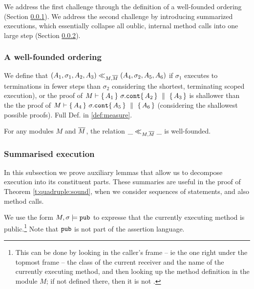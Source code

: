 We address the first challenge  through the definition of a well-founded ordering (\cf Section \ref{sect:prove:wellfounded}). 
We address the second challenge by introducing summarized executions, which essentially collapse all oublic, internal method calls into one large step (\cf Section \ref{sect:termExecs}).

\subsubsection{A well-founded ordering}
\label{sect:prove:wellfounded}

We define that $(A_1,\sigma_1,A_2, A_3) \ll_{M,\overline{M}}  (A_4,\sigma_2,A_5, A_6)$ if $\sigma_1$ executes to terminations in fewer steps than $\sigma_2$ considering the shortest, terminating scoped execution), or  the proof of $M \vdash  \{\, A_1 \, \}\ \sigma.\mbox{\normalfont{\texttt{cont}}} \{\, A_2 \, \} \, \,\parallel\,\, \{\, A_3 \, \}  $
is shallower than the the proof of  $M \vdash  \{\, A_4 \, \}\ \sigma.\mbox{\normalfont{\texttt{cont}}} \{\, A_5 \, \} \, \,\parallel\,\, \{\, A_6 \, \}  $ (considering the shallowest possible proofs). Full Def. in \ref{def:measure}.

 

 


\begin{auxLemma}
\label{lemma:normal:two}
For any modules $M$ and $\overline{M}$,  the relation $\_ \ll_{M,\overline{M}}  \_$ is well-founded.
\end{auxLemma}

\subsubsection{Summarised  execution} 
\label{sect:termExecs}

In this subsection we prove auxiliary lemmas that allow us to decompose execution into its constituent parts. 
These summaries are useful in the proof of Theorem \ref{t:quadruple:sound}, when we consider sequences of statements, and also method calls.


 
\begin{definition}
We use the form
$M, \sigma \models \mbox{\normalfont{\texttt{pub}}}$ to expresse that the currently executing method is public.\footnote{This can be done by looking in the caller's frame -- ie the one right under the topmost frame -- the class of the current receiver and the name of the currently executing method, and then looking up the method definition in the module $M$; if not defined there, then it is not . }
Note that $\mbox{\normalfont{\texttt{pub}}}$ is not part of the assertion language.
\end{definition}
 


